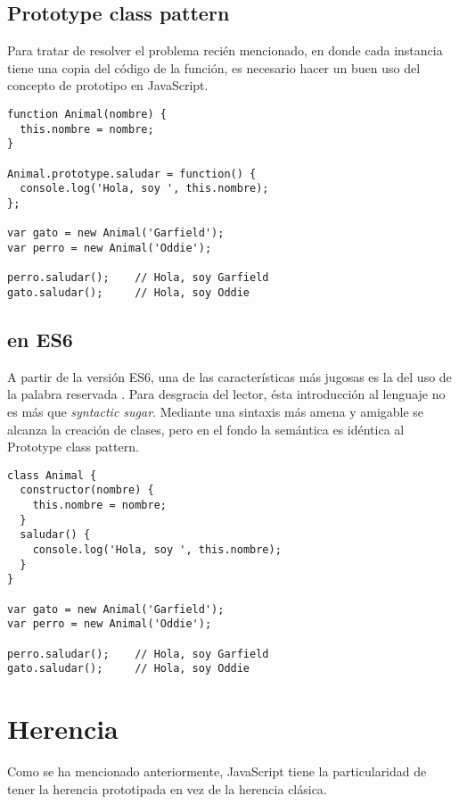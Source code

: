 \subsection{Prototype class pattern}

Para tratar de resolver el problema recién mencionado, en donde cada instancia tiene una copia del código de la función, es necesario hacer un buen uso del concepto de prototipo en JavaScript.

\begin{lstlisting}[title={Prototype class pattern}]
function Animal(nombre) {
  this.nombre = nombre;
}

Animal.prototype.saludar = function() {
  console.log('Hola, soy ', this.nombre);
};

var gato = new Animal('Garfield');
var perro = new Animal('Oddie');

perro.saludar(); 	// Hola, soy Garfield
gato.saludar(); 	// Hola, soy Oddie
\end{lstlisting}


\subsection{ en ES6}

A partir de la versión ES6, una de las características más jugosas es la del uso de la palabra reservada . Para desgracia del lector, ésta introducción al lenguaje no es más que \textit{syntactic sugar}. Mediante una sintaxis más amena y amigable se alcanza la creación de clases, pero en el fondo la semántica es idéntica al Prototype class pattern.

\begin{lstlisting}[title={Ejemplo de \code{class}}]
class Animal {
  constructor(nombre) {
    this.nombre = nombre;
  }
  saludar() {
    console.log('Hola, soy ', this.nombre);
  }
}

var gato = new Animal('Garfield');
var perro = new Animal('Oddie');

perro.saludar(); 	// Hola, soy Garfield
gato.saludar(); 	// Hola, soy Oddie
\end{lstlisting}

\section{Herencia}

Como se ha mencionado anteriormente, JavaScript tiene la particularidad de tener la herencia prototipada en vez de la herencia clásica. 

